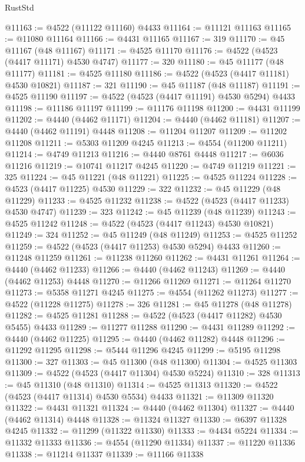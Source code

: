 \begin{lexlean}{RustStd}
\begin{coremodule}
@11163 := @4522 (@11122 @11160) @4433
@11164 := @11121 @11163
@11165 := @11080 @11164
@11166 := @4431 @11165
@11167 := 319
@11170 := @45 @11167 (@48 @11167)
@11171 := @4525 @11170
@11176 := @4522 (@4523 (@4417 @11171) @4530 @4747)
@11177 := 320
@11180 := @45 @11177 (@48 @11177)
@11181 := @4525 @11180
@11186 := @4522 (@4523 (@4417 @11181) @4530 @10821)
@11187 := 321
@11190 := @45 @11187 (@48 @11187)
@11191 := @4525 @11190
@11197 := @4522 (@4523 (@4417 @11191) @4530 @5294) @4433
@11198 := @11186 @11197
@11199 := @11176 @11198
@11200 := @4431 @11199
@11202 := @4440 (@4462 @11171)
@11204 := @4440 (@4462 @11181)
@11207 := @4440 (@4462 @11191) @4448
@11208 := @11204 @11207
@11209 := @11202 @11208
@11211 := @5303 @11209 @4245
@11213 := @4554 (@11200 @11211)
@11214 := @4749 @11213
@11216 := @4440 @8761 @4448
@11217 := @6036 @11216
@11219 := @10741 @11217 @4245
@11220 := @4749 @11219
@11221 := 325
@11224 := @45 @11221 (@48 @11221)
@11225 := @4525 @11224
@11228 := @4523 (@4417 @11225) @4530
@11229 := 322
@11232 := @45 @11229 (@48 @11229)
@11233 := @4525 @11232
@11238 := @4522 (@4523 (@4417 @11233) @4530 @4747)
@11239 := 323
@11242 := @45 @11239 (@48 @11239)
@11243 := @4525 @11242
@11248 := @4522 (@4523 (@4417 @11243) @4530 @10821)
@11249 := 324
@11252 := @45 @11249 (@48 @11249)
@11253 := @4525 @11252
@11259 := @4522 (@4523 (@4417 @11253) @4530 @5294) @4433
@11260 := @11248 @11259
@11261 := @11238 @11260
@11262 := @4431 @11261
@11264 := @4440 (@4462 @11233)
@11266 := @4440 (@4462 @11243)
@11269 := @4440 (@4462 @11253) @4448
@11270 := @11266 @11269
@11271 := @11264 @11270
@11273 := @5358 @11271 @4245
@11275 := @4554 (@11262 @11273)
@11277 := @4522 (@11228 @11275)
@11278 := 326
@11281 := @45 @11278 (@48 @11278)
@11282 := @4525 @11281
@11288 := @4522 (@4523 (@4417 @11282) @4530 @5455) @4433
@11289 := @11277 @11288
@11290 := @4431 @11289
@11292 := @4440 (@4462 @11225)
@11295 := @4440 (@4462 @11282) @4448
@11296 := @11292 @11295
@11298 := @5444 @11296 @4245
@11299 := @5195 @11298
@11300 := 327
@11303 := @45 @11300 (@48 @11300)
@11304 := @4525 @11303
@11309 := @4522 (@4523 (@4417 @11304) @4530 @5224)
@11310 := 328
@11313 := @45 @11310 (@48 @11310)
@11314 := @4525 @11313
@11320 := @4522 (@4523 (@4417 @11314) @4530 @5534) @4433
@11321 := @11309 @11320
@11322 := @4431 @11321
@11324 := @4440 (@4462 @11304)
@11327 := @4440 (@4462 @11314) @4448
@11328 := @11324 @11327
@11330 := @6397 @11328 @4245
@11332 := @11299 (@11322 @11330)
@11333 := @4434 @5224
@11334 := @11332 @11333
@11336 := @4554 (@11290 @11334)
@11337 := @11220 @11336
@11338 := @11214 @11337
@11339 := @11166 @11338

\end{coremodule}
\end{lexlean}
